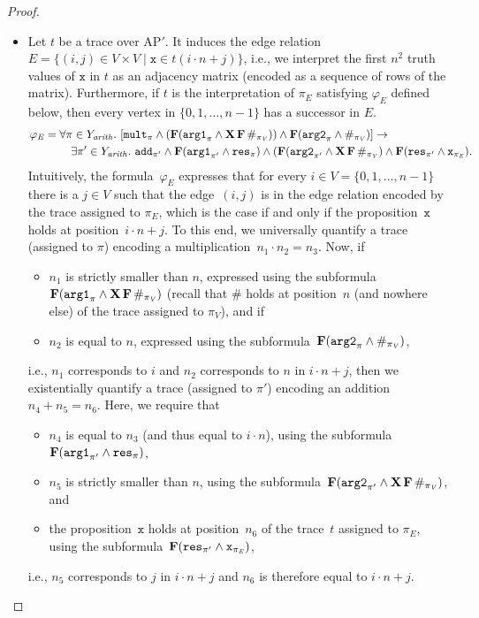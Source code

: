 \documentclass[dvipsnames,10pt,a4paper]{amsart}
\theoremstyle{definition}
\theoremstyle{remark}
\renewcommand{\phi}{\varphi}
\newcommand{\set}[1]{\{#1\}}
\newcommand{\F}{\mathop{\mathbf{F}\vphantom{a}}\nolimits}
\newcommand{\X}{\mathop{\mathbf{X}\vphantom{a}}\nolimits}
\newcommand{\ap}[0]{\mathrm{AP}}
\newcommand{\inprop}{\mathtt{x}}
\newcommand{\argone}{\texttt{arg1}}
\newcommand{\argtwo}{\texttt{arg2}}
\newcommand{\res}{\texttt{res}}
\newcommand{\add}{\texttt{add}}
\newcommand{\mult}{\texttt{mult}}
\newcommand{\arith}{\mathit{arith}}
\newcommand{\vertices}{\mathit{V}}
\newcommand{\edges}{\mathit{E}}
\begin{document}
\begin{proof}
\begin{itemize}
	\item 
Let $t$ be a trace over $\ap'$. It induces the edge relation~$E = 
\set{(i,j) \in V\times V \mid \inprop \in t(i\cdot n + j)}$, i.e., we interpret 
the first $n^2$ truth values of $\inprop$ in $t$ as an adjacency matrix (encoded as a sequence of rows of the matrix). Furthermore, if $t$ is the interpretation of $\pi_\edges$ satisfying $\phi_\edges$ defined below, then every vertex in $\set{0,1,\ldots, n-1}$ has a successor in $E$.
	\begin{align*}
	\phi_\edges ={}&{} \forall \pi \in Y_\arith.\ [\mult_\pi \wedge (\F (\argone_{\pi} \wedge \X\F \#_{\pi_\vertices}))\wedge \F(\argtwo_\pi \wedge \#_{\pi_\vertices})]\rightarrow \\
	{}&{}\quad\exists \pi' \in Y_\arith.\ 
	\add_{\pi'} \wedge 
	\F(\argone_{\pi'} \wedge \res_{\pi}) \wedge 
	(\F (\argtwo_{\pi'} \wedge \X\F \#_{\pi_\vertices}) \wedge 
	\F(\res_{\pi'} \wedge 
	\inprop_{\pi_\edges}).
	\end{align*}
Intuitively, the formula~$\phi_\edges$ expresses that for every $i \in V = \set{0,1,\ldots, n-1}$ there is a $j \in V$ such that the edge~$(i,j)$ is in the edge relation encoded by the trace assigned to $\pi_E$, which is the case if and only if the proposition~$\inprop$ holds at position~$i \cdot n +j$.
To this end, we universally quantify a trace (assigned to $\pi$) encoding a multiplication~$n_1 \cdot n_2= n_3$.
Now, if 
\begin{itemize}
    \item $n_1$ is strictly smaller than $n$, expressed using the subformula~$\F (\argone_{\pi} \wedge \X\F \#_{\pi_\vertices})$ (recall that $\#$ holds at position~$n$ (and nowhere else) of the trace assigned to $\pi_V$), and if
    \item $n_2$ is equal to $n$, expressed using the subformula~$\F(\argtwo_\pi \wedge \#_{\pi_\vertices})$,
\end{itemize}
i.e., $n_1$ corresponds to $i$ and $n_2$ corresponds to $n$ in $i \cdot n +j$,
then we existentially quantify a trace (assigned to $\pi'$) encoding an addition~$n_4 + n_5 = n_6$.
Here, we require that
\begin{itemize}
    \item $n_4 $ is equal to $ n_3$ (and thus equal to $i \cdot n$), using the subformula~$\F(\argone_{\pi'} \wedge \res_{\pi})$,
    \item $n_5$ is strictly smaller than $n$, using the subformula~$\F (\argtwo_{\pi'} \wedge \X\F \#_{\pi_\vertices})$, and
    \item the proposition~$\inprop$ holds at position~$n_6$ of the trace~$t$ assigned to $\pi_\edges$, using the subformula~$\F(\res_{\pi'} \wedge 
	\inprop_{\pi_\edges})$,
\end{itemize}
i.e., $n_5$ corresponds to $j$ in $i \cdot n +j$ and $n_6$ is therefore equal to $i \cdot n +j$.


\end{itemize}
\end{proof}
\end{document}
